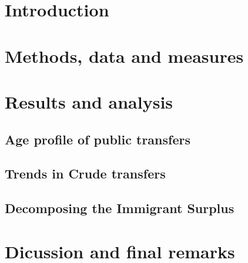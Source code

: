 \section{Introduction}
  

\section{Methods, data and measures }
  

\section{Results and analysis}
  \subsection{Age profile of public transfers}
    \label{sec:life}
  \subsection{Trends in Crude transfers}
    \label{sec:crude}
  \subsection{Decomposing the Immigrant Surplus}
    \label{sec:decomp}

\section{Dicussion and final remarks}
  

